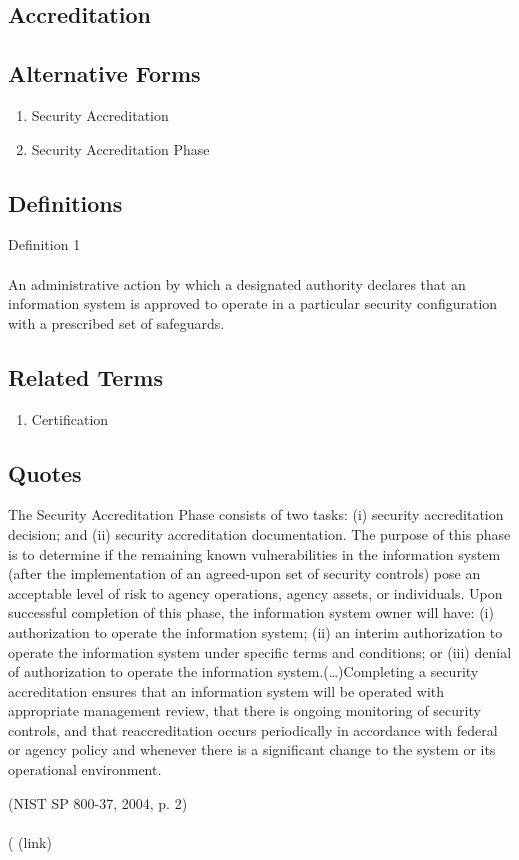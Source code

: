 \newpage \subsection*{Accreditation } \subsection*{Alternative Forms } \begin{enumerate} \item  Security Accreditation  \item  Security Accreditation Phase  \end{enumerate} \subsection*{Definitions } \begin{DIC_Def}{Definition 1 }{} \paragraph{} An administrative action by which a designated authority declares that an information system is approved to operate in a particular security configuration with a prescribed set of safeguards.  \end{DIC_Def} \subsection*{Related Terms } \begin{enumerate} \item  Certification  \end{enumerate} \subsection*{Quotes } \begin{DIC_BlockQuote} The Security Accreditation Phase consists of two tasks: (i) security accreditation decision; and (ii) security accreditation documentation. The purpose of this phase is to determine if the remaining known vulnerabilities in the information system (after the implementation of an agreed-upon set of security controls) pose an acceptable level of risk to agency operations, agency assets, or individuals. Upon successful completion of this phase, the information system owner will have: (i) authorization to operate the information system; (ii) an interim authorization to operate the information system under specific terms and conditions; or (iii) denial of authorization to operate the information system.(\ldots)Completing a security accreditation ensures that an information system will be operated with appropriate management review, that there is ongoing monitoring of security controls, and that reaccreditation occurs periodically in accordance with federal or agency policy and whenever there is a significant change to the system or its operational environment.  \end{DIC_BlockQuote} (NIST SP 800-37, 2004, p. 2)  \paragraph{} (  (link) 